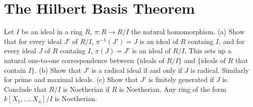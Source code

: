 \section{The Hilbert Basis Theorem}

\begin{exercise}
    Let $I$ be an ideal in a ring $R$, $\pi : R \to R/I$ the natural homomorphism. (a) Show that for every ideal $J'$ of $R/I$, $\pi^{-1}(J') = J$ is an ideal of $R$ containg $I$, and for every ideal $J$ of $R$ containg $I$, $\pi(J) = J'$ is an ideal of $R/I$. This sets up a natural one-to-one correspondence between $\{$ideals of $R/I \}$ and $\{$ideals of $R$ that contain $I \}$. (b) Show that $J'$ is a radical ideal if and only if $J$ is radical. Similarly for prime and maximal ideals. (c) Show that $J'$ is finitely generated if $J$ is. Conclude that $R/I$ is Noetherian if $R$ is Noetherian. Any ring of the form $k[X_1, ..., X_n]/I$ is Noetherian. \\
\end{exercise}

